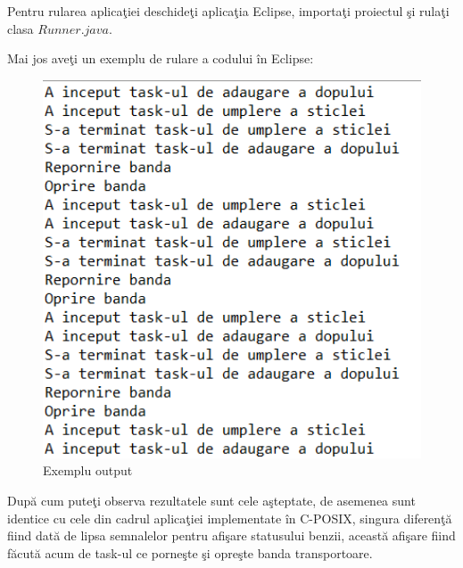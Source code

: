 \documentclass[a4paper, 11pt]{article}
\begin{document}
\hspace{2pc}Pentru rularea aplica\c{t}iei deschide\c{t}i aplica\c{t}ia Eclipse, importa\c{t}i proiectul \c{s}i rula\c{t}i clasa $Runner.java$.

Mai jos ave\c{t}i un exemplu de rulare a codului \^{i}n Eclipse:


\begin{figure} [!htb]
\centering
\includegraphics[width=12cm]{./images/Exemplu_rulare.png}
\caption{\label{fig:exemplu}Exemplu output}
\end{figure} 

Dup\u{a} cum pute\c{t}i observa rezultatele sunt cele a\c{s}teptate, de asemenea sunt identice cu cele din cadrul aplica\c{t}iei implementate \^{i}n C-POSIX, singura diferen\c{t}\u{a} fiind dat\u{a} de lipsa semnalelor pentru afi\c{s}are statusului benzii, aceast\u{a} afi\c{s}are fiind f\u{a}cut\u{a} acum de task-ul ce porne\c{s}te \c{s}i opre\c{s}te banda transportoare.

%
\end{document}

